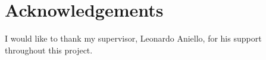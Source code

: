 \section*{Acknowledgements}

I would like to thank my supervisor,
Leonardo Aniello, for his support
throughout this project.